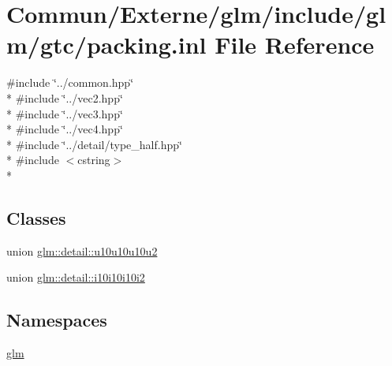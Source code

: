 \hypertarget{packing_8inl}{}\section{Commun/\+Externe/glm/include/glm/gtc/packing.inl File Reference}
\label{packing_8inl}
{\ttfamily \#include \char`\"{}../common.\+hpp\char`\"{}}\\*
{\ttfamily \#include \char`\"{}../vec2.\+hpp\char`\"{}}\\*
{\ttfamily \#include \char`\"{}../vec3.\+hpp\char`\"{}}\\*
{\ttfamily \#include \char`\"{}../vec4.\+hpp\char`\"{}}\\*
{\ttfamily \#include \char`\"{}../detail/type\+\_\+half.\+hpp\char`\"{}}\\*
{\ttfamily \#include $<$cstring$>$}\\*
\subsection*{Classes}
\begin{DoxyCompactItemize}
\item 
union \hyperlink{unionglm_1_1detail_1_1u10u10u10u2}{glm\+::detail\+::u10u10u10u2}
\item 
union \hyperlink{unionglm_1_1detail_1_1i10i10i10i2}{glm\+::detail\+::i10i10i10i2}
\end{DoxyCompactItemize}
\subsection*{Namespaces}
\begin{DoxyCompactItemize}
\item 
 \hyperlink{namespaceglm}{glm}
\end{DoxyCompactItemize}
